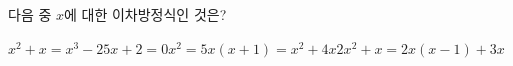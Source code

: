 다음 중 $x$에 대한 이차방정식인 것은?
\begin{choicesii}{$x^2+x=x^3-2$}{$5x+2=0$}{$x^2=5$}{$x(x+1)=x^2+4x$}{$2x^2+x=2x(x-1)+3x$}\end{choicesii}
